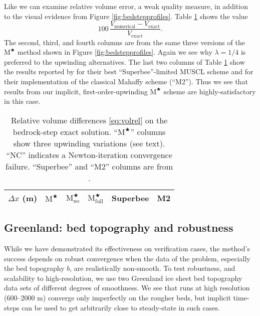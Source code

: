 \documentclass[twocolumn,a4paper]{igs}
\newcommand{\Mstar}{$\text{M}^{\bigstar}$\xspace}
\newcommand{\Mstarnoup}{$\text{M}^{\bigstar}_{\text{no}}$\xspace}
\newcommand{\Mstarfullup}{$\text{M}^{\bigstar}_{\text{full}}$\xspace}
\begin{document}
Like \cite{JaroschSchoofAnslow2013} we can examine relative volume error, a weak quality measure, in addition to the visual evidence from Figure \ref{fig:bedstepprofiles}.  Table \ref{tab:bedstepvol} shows the value
\begin{equation}
100\, \frac{V_{\text{numerical}} - V_{\text{exact}}}{V_{\text{exact}}}. \label{eq:volrel}
\end{equation}
The second, third, and fourth columns are from the same three versions of the \Mstar method shown in Figure \ref{fig:bedstepprofiles}.  Again we see why $\lambda=1/4$ is preferred to the upwinding alternatives.  The last two columns of Table \ref{tab:bedstepvol} show the results reported by \cite{JaroschSchoofAnslow2013} for their best ``Superbee''-limited MUSCL scheme and for their implementation of the classical Mahaffy scheme (``M2'').  Thus we see that results from our implicit, first-order-upwinding \Mstar scheme are highly-satisfactory in this case.

\begin{table}[ht]
  \caption{Relative volume differences \eqref{eq:volrel} on the bedrock-step exact solution.  ``\Mstar'' columns show three upwinding variations (see text).  ``NC'' indicates a Newton-iteration convergence failure.  ``Superbee'' and ``M2'' columns are from \cite{JaroschSchoofAnslow2013}.}
  \vskip4mm \centering
  \begin{tabular}{lccccc}
    $\Delta x$ (m) & \Mstar & \Mstarnoup & \Mstarfullup & Superbee & M2 \\  \hline

  \end{tabular}
  \label{tab:bedstepvol}
\end{table}


\subsection{Greenland: bed topography and robustness}

While we have demonstrated its effectiveness on verification cases, the method's success depends on robust convergence when the data of the problem, especially the bed topography $b$, are realistically non-smooth.  To test robustness, and scalability to high-resolution, we use two Greenland ice sheet bed topography data sets of different degrees of smoothness.  We see that runs at high resolution (600--2000 m) converge only imperfectly on the rougher beds, but implicit time-steps can be used to get arbitrarily close to steady-state in such cases.
\end{document}
